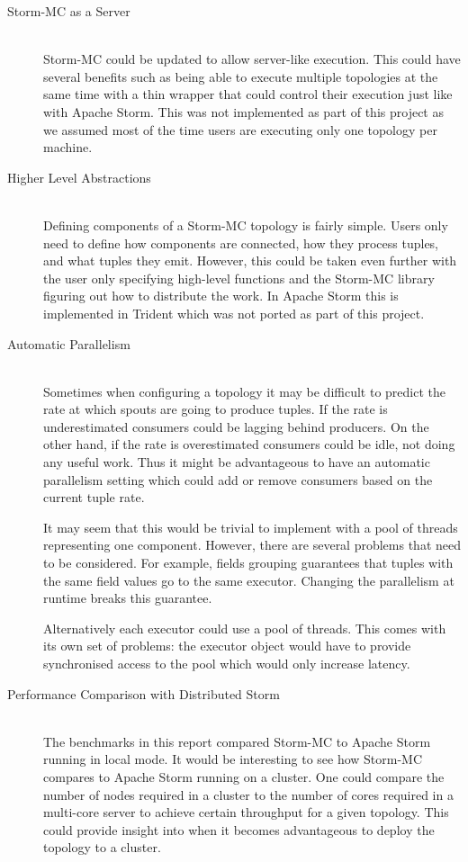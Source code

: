 \documentclass[bsc,logo,frontabs,twoside,singlespacing,normalheadings,parskip]{infthesis}\usepackage[]{graphicx}\usepackage[]{color}
\begin{document}
\begin{description}
	\item[Storm-MC as a Server] \hfill \\
	Storm-MC could be updated to allow server-like execution. This could have several benefits such as being able to execute multiple topologies at the same time with a thin wrapper that could control their execution just like with Apache Storm. This was not implemented as part of this project as we assumed most of the time users are executing only one topology per machine.
	\item[Higher Level Abstractions] \hfill \\
	Defining components of a Storm-MC topology is fairly simple. Users only need to define how components are connected, how they process tuples, and what tuples they emit. However, this could be taken even further with the user only specifying high-level functions and the Storm-MC library figuring out how to distribute the work. In Apache Storm this is implemented in Trident which was not ported as part of this project.
	\item[Automatic Parallelism] \hfill \\
	Sometimes when configuring a topology it may be difficult to predict the rate at which spouts are going to produce tuples. If the rate is underestimated consumers could be lagging behind producers. On the other hand, if the rate is overestimated consumers could be idle, not doing any useful work. Thus it might be advantageous to have an automatic parallelism setting which could add or remove consumers based on the current tuple rate.
	
	It may seem that this would be trivial to implement with a pool of threads representing one component. However, there are several problems that need to be considered. For example, fields grouping guarantees that tuples with the same field values go to the same executor. Changing the parallelism at runtime breaks this guarantee.
	
	Alternatively each executor could use a pool of threads. This comes with its own set of problems: the executor object would have to provide synchronised access to the pool which would only increase latency.
	\item[Performance Comparison with Distributed Storm] \hfill \\
	The benchmarks in this report compared Storm-MC to Apache Storm running in local mode. It would be interesting to see how Storm-MC compares to Apache Storm running on a cluster. One could compare the number of nodes required in a cluster to the number of cores required in a multi-core server to achieve certain throughput for a given topology. This could provide insight into when it becomes advantageous to deploy the topology to a cluster.
\end{description}
\clearpage{}
\end{document}
